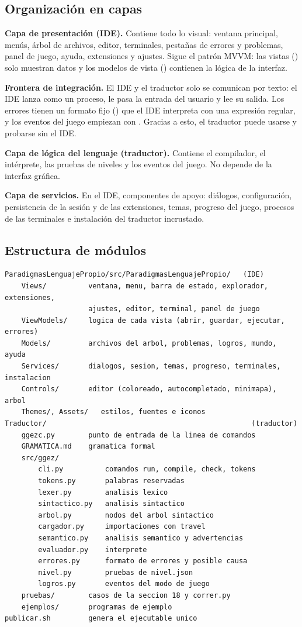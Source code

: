 \subsection{Organización en capas}

\textbf{Capa de presentación (IDE).} Contiene todo lo visual: ventana principal, menús, árbol de archivos, editor, terminales, pestañas de errores y problemas, panel de juego, ayuda, extensiones y ajustes. Sigue el patrón MVVM: las vistas () solo muestran datos y los modelos de vista () contienen la lógica de la interfaz.

\textbf{Frontera de integración.} El IDE y el traductor solo se comunican por texto: el IDE lanza  como un proceso, le pasa la entrada del usuario y lee su salida. Los errores tienen un formato fijo () que el IDE interpreta con una expresión regular, y los eventos del juego empiezan con . Gracias a esto, el traductor puede usarse y probarse sin el IDE.

\textbf{Capa de lógica del lenguaje (traductor).} Contiene el compilador, el intérprete, las pruebas de niveles y los eventos del juego. No depende de la interfaz gráfica.

\textbf{Capa de servicios.} En el IDE, componentes de apoyo: diálogos, configuración, persistencia de la sesión y de las extensiones, temas, progreso del juego, procesos de las terminales e instalación del traductor incrustado.

\subsection{Estructura de módulos}

\begin{lstlisting}[language={}]
ParadigmasLenguajePropio/src/ParadigmasLenguajePropio/   (IDE)
    Views/          ventana, menu, barra de estado, explorador, extensiones,
                    ajustes, editor, terminal, panel de juego
    ViewModels/     logica de cada vista (abrir, guardar, ejecutar, errores)
    Models/         archivos del arbol, problemas, logros, mundo, ayuda
    Services/       dialogos, sesion, temas, progreso, terminales, instalacion
    Controls/       editor (coloreado, autocompletado, minimapa), arbol
    Themes/, Assets/   estilos, fuentes e iconos
Traductor/                                                 (traductor)
    ggezc.py        punto de entrada de la linea de comandos
    GRAMATICA.md    gramatica formal
    src/ggez/
        cli.py          comandos run, compile, check, tokens
        tokens.py       palabras reservadas
        lexer.py        analisis lexico
        sintactico.py   analisis sintactico
        arbol.py        nodos del arbol sintactico
        cargador.py     importaciones con travel
        semantico.py    analisis semantico y advertencias
        evaluador.py    interprete
        errores.py      formato de errores y posible causa
        nivel.py        pruebas de nivel.json
        logros.py       eventos del modo de juego
    pruebas/        casos de la seccion 18 y correr.py
    ejemplos/       programas de ejemplo
publicar.sh         genera el ejecutable unico
\end{lstlisting}

